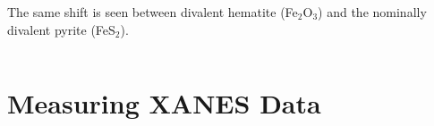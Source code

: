 \documentclass[10pt, xcolor=x11names, compress]{beamer}
\begin{document}
\begin{frame}
\begin{columns}
\begin{column}{0.4\linewidth}
      The same shift is seen between divalent {\color{Blue3} hematite
        (Fe$_2$O$_3$)} and the nominally divalent {\color{Red2}pyrite
        (FeS$_2$)}.
    \end{column}
  \end{columns}
  \begin{columns}
    \begin{column}{0.6\linewidth}
    \end{column}
    \begin{column}{0.4\linewidth}
    \end{column}
  \end{columns}
\end{frame}


\section[Measure]{Measuring XANES Data}
\end{document}
